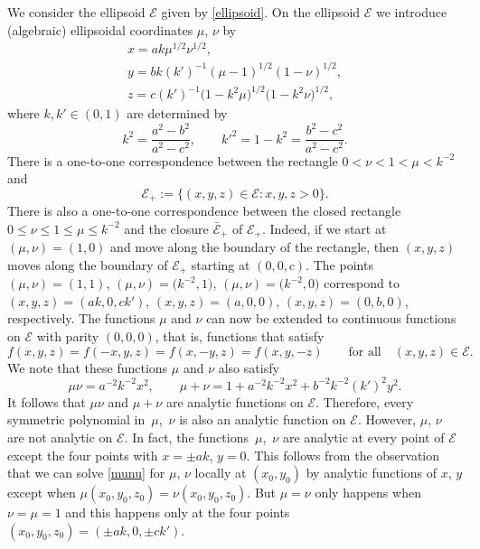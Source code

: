 \documentclass[10pt,a4paper]{amsart}
\newcommand{\E}{\mathcal{E}}
\numberwithin{equation}{section}
\begin{document}
We consider the ellipsoid $\E$ given by \eqref{ellipsoid}.
On the ellipsoid $\E$ we introduce (algebraic) ellipsoidal coordinates $\mu$, $\nu$ \cite[Section~15.1.1]{EMO3} by
\begin{gather}
x=a k\mu^{1/2}\nu^{1/2},\label{ell1}\\
y= b k (k')^{-1}(\mu-1)^{1/2}(1-\nu)^{1/2},\label{ell2}\\
z=c (k')^{-1}\bigl(1-k^2\mu\bigr)^{1/2}\bigl(1-k^2\nu\bigr)^{1/2},\label{ell3}
\end{gather}
where $k,k'\in(0,1)$ are determined by
\begin{equation}\label{k}
 k^2=\frac{a^2-b^2}{a^2-c^2},\qquad k'^2=1-k^2= \frac{b^2-c^2}{a^2-c^2}.
 \end{equation}
There is a one-to-one correspondence between the rectangle $0<\nu<1<\mu<k^{-2}$ and
\[ \E_+:=\{(x,y,z)\in\E\colon x,y,z>0\} .\]
There is also a one-to-one correspondence between the closed rectangle ${0\le\nu\le 1\le \mu\le k^{-2}}$
and the closure $\bar{\E}_+$ of $\E_+$.
Indeed, if we start at $(\mu,\nu)=(1,0)$ and move along the boundary of the rectangle, then
$(x,y,z)$ moves along the boundary of $\E_+$ starting at $(0,0,c)$. The points $(\mu,\nu)=(1,1)$, $(\mu,\nu)=\bigl(k^{-2},1\bigr)$, $(\mu,\nu)=\bigl(k^{-2},0\bigr)$ correspond to
$(x,y,z)=(ak,0,ck')$, $(x,y,z)=(a,0,0)$, $(x,y,z)=(0,b,0)$, respectively.
The functions $\mu$ and $\nu$ can now be extended to continuous functions on $\E$ with parity $(0,0,0)$,
that is, functions that satisfy
\[ f(x,y,z)=f(-x,y,z)=f(x,-y,z)=f(x,y,-z)\qquad \text{for all} \quad (x,y,z)\in\E.\]
We note that these functions $\mu$ and $\nu$ also satisfy
\begin{equation}\label{munu}
\mu\nu=a^{-2}k^{-2} x^2,\qquad \mu+\nu=1+a^{-2}k^{-2} x^2+b^{-2}k^{-2}(k')^2y^2 .
\end{equation}
It follows that $\mu\nu$ and $\mu+\nu$ are analytic functions on $\E$. Therefore, every symmetric polynomial
in~$\mu$,~$\nu$ is also an analytic function on $\E$. However, $\mu$, $\nu$ are not analytic on $\E$.
In fact, the functions~$\mu$,~$\nu$ are analytic at every point of $\E$ except the four points
with $x=\pm ak$, $y=0$. This follows from the observation that we can solve \eqref{munu} for $\mu$, $\nu$
locally at $(x_0,y_0)$ by analytic functions of $x$, $y$ except when $\mu(x_0,y_0,z_0)=\nu(x_0,y_0,z_0)$.
But $\mu=\nu$ only happens when $\nu=\mu=1$ and this happens only at the four points $(x_0,y_0,z_0)=(\pm ak,0,\pm ck')$.
\end{document}
